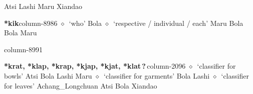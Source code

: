 \hspace{1ex}
         Atsi 
\hspace{1ex}
         Lashi 
\hspace{1ex}
         Maru 
\hspace{1ex}
         Xiandao 
  \item {\footnotesize \textbf{*kik}}{\tiny column-8986}
         $\diamond$~`who'
         Bola 
\hspace{1ex}
         $\diamond$~`respective / individual / each'
         Maru 
\hspace{1ex}
         Bola 
\hspace{1ex}
         Bola 
\hspace{1ex}
         Maru 
  \item {\footnotesize \textbf{}}{\tiny column-8991}
  \item {\footnotesize \textbf{*krat, *klap, *krap, *kjap, *kjat, *klat\,?\,}}{\tiny column-2096}
         $\diamond$~`classifier for bowls'
         Atsi 
\hspace{1ex}
         Bola 
\hspace{1ex}
         Lashi 
\hspace{1ex}
         Maru 
\hspace{1ex}
         $\diamond$~`classifier for garments'
         Bola 
\hspace{1ex}
         Lashi 
\hspace{1ex}
         $\diamond$~`classifier for leaves'
         Achang\_Longchuan 
\hspace{1ex}
         Atsi 
\hspace{1ex}
         Bola 
\hspace{1ex}
         Xiandao 
\hspace{1ex}
